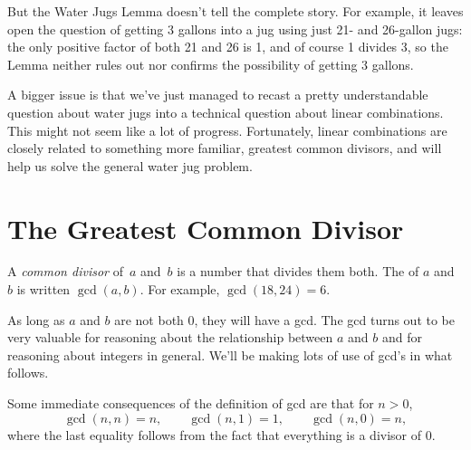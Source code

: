But the Water Jugs Lemma doesn't tell the complete story.  For
example, it leaves open the question of getting 3 gallons into a jug
using just 21- and 26-gallon jugs: the only positive factor of both 21
and 26 is 1, and of course 1 divides 3, so the Lemma neither rules out
nor confirms the possibility of getting 3 gallons.

A bigger issue is that we've just managed to recast a pretty
understandable question about water jugs into a technical question
about linear combinations.  This might not seem like a lot of
progress.  Fortunately, linear combinations are closely related to
something more familiar, greatest common divisors, and
will help us solve the general water jug problem.

\begin{problems}
\practiceproblems
{}

\classproblems
{}

\end{problems}

\section{The Greatest Common Divisor}\label{sec:gcd}

A \emph{common divisor} of~$a$ and~$b$ is a number that divides them
both.  The  of $a$ and~$b$ is written%
$\gcd(a, b)$.  For example, $\gcd(18, 24) = 6$.

As long as $a$ and $b$ are not both 0, they will have a gcd.  The gcd
turns out to be very valuable for reasoning about the relationship
between $a$ and $b$ and for reasoning about integers in general.
We'll be making lots of use of gcd's in what follows.

Some immediate consequences of the definition of gcd are that for $n > 0$,
\[
\gcd(n, n) = n, \qquad \gcd(n, 1) = 1, \qquad  \gcd(n,0) = n,
\]
where the last equality follows from the fact that everything is a
divisor of 0.

